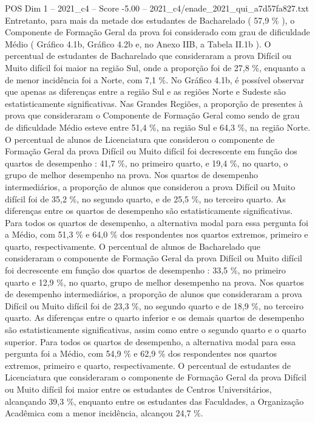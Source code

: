 \begin{textsample}{POS Dim 1 – 2021\_c4 – Score -5.00 – 2021\_c4/enade\_2021\_qui\_a7d57fa827.txt}
Entretanto, para mais da metade dos estudantes de Bacharelado ( 57,9 \% ), o Componente de Formação Geral da prova foi considerado com grau de dificuldade Médio ( Gráfico 4.1b, Gráfico 4.2b e, no Anexo IIB, a Tabela II.1b ).
O percentual de estudantes de Bacharelado que consideraram a prova Difícil ou Muito difícil foi maior na região Sul, onde a proporção foi de 27,8 \%, enquanto a de menor incidência foi a Norte, com 7,1 \%.
No Gráfico 4.1b, é possível observar que apenas as diferenças entre a região Sul e as regiões Norte e Sudeste são estatisticamente significativas.
Nas Grandes Regiões, a proporção de presentes à prova que consideraram o Componente de Formação Geral como sendo de grau de dificuldade Médio esteve entre 51,4 \%, na região Sul e 64,3 \%, na região Norte.
O percentual de alunos de Licenciatura que considerou o componente de Formação Geral da prova Difícil ou Muito difícil foi decrescente em função dos quartos de desempenho : 41,7 \%, no primeiro quarto, e 19,4 \%, no quarto, o grupo de melhor desempenho na prova.
Nos quartos de desempenho intermediários, a proporção de alunos que considerou a prova Difícil ou Muito difícil foi de 35,2 \%, no segundo quarto, e de 25,5 \%, no terceiro quarto.
As diferenças entre os quartos de desempenho são estatisticamente significativas.
Para todos os quartos de desempenho, a alternativa modal para essa pergunta foi a Médio, com 51,3 \% e 64,0 \% dos respondentes nos quartos extremos, primeiro e quarto, respectivamente.
O percentual de alunos de Bacharelado que consideraram o componente de Formação Geral da prova Difícil ou Muito difícil foi decrescente em função dos quartos de desempenho : 33,5 \%, no primeiro quarto e 12,9 \%, no quarto, grupo de melhor desempenho na prova.
Nos quartos de desempenho intermediários, a proporção de alunos que consideraram a prova Difícil ou Muito difícil foi de 23,3 \%, no segundo quarto e de 18,9 \%, no terceiro quarto.
As diferenças entre o quarto inferior e os demais quartos de desempenho são estatisticamente significativas, assim como entre o segundo quarto e o quarto superior.
Para todos os quartos de desempenho, a alternativa modal para essa pergunta foi a Médio, com 54,9 \% e 62,9 \% dos respondentes nos quartos extremos, primeiro e quarto, respectivamente.
O percentual de estudantes de Licenciatura que consideraram o componente de Formação Geral da prova Difícil ou Muito difícil foi maior entre os estudantes de Centros Universitários, alcançando 39,3 \%, enquanto entre os estudantes das Faculdades, a Organização Acadêmica com a menor incidência, alcançou 24,7 \%.

\end{textsample}
